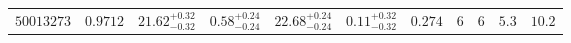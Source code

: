\documentclass[11pt,twocolumn]{article}
\begin{document}
\begin{table}[!t]
\begin{tabular}{@{}rrrrrrrccrr@{}}
  $50013273$ & $0.9712$ & $21.62^{+0.32}_{-0.32}$ & $0.58^{+0.24}_{-0.24}$ & $22.68^{+0.24}_{-0.24}$ & $0.11^{+0.32}_{-0.32}$ & $0.274$ & $6$ & $6$ & $5.3$ & $10.2$\\


\end{tabular}
\end{table}
\end{document}
